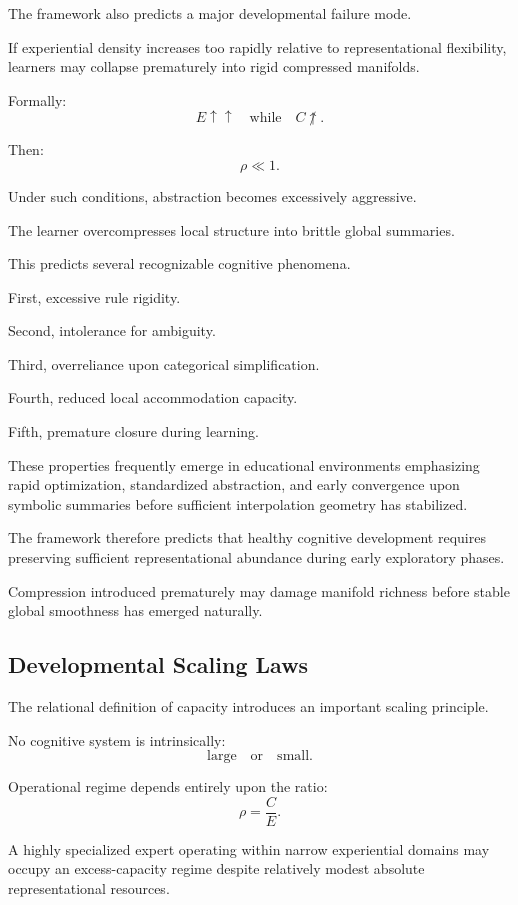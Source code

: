 \documentclass[12pt,a4paper]{article}
\begin{document}
The framework also predicts a major developmental failure mode.

If experiential density increases too rapidly relative to representational flexibility, learners may collapse prematurely into rigid compressed manifolds.

Formally:
\[
E
\uparrow\uparrow
\quad
\text{while}
\quad
C
\not\uparrow.
\]

Then:
\[
\rho
\ll
1.
\]

Under such conditions, abstraction becomes excessively aggressive.

The learner overcompresses local structure into brittle global summaries.

This predicts several recognizable cognitive phenomena.

First, excessive rule rigidity.

Second, intolerance for ambiguity.

Third, overreliance upon categorical simplification.

Fourth, reduced local accommodation capacity.

Fifth, premature closure during learning.

These properties frequently emerge in educational environments emphasizing rapid optimization, standardized abstraction, and early convergence upon symbolic summaries before sufficient interpolation geometry has stabilized.

The framework therefore predicts that healthy cognitive development requires preserving sufficient representational abundance during early exploratory phases.

Compression introduced prematurely may damage manifold richness before stable global smoothness has emerged naturally.

\subsection{Developmental Scaling Laws}

The relational definition of capacity introduces an important scaling principle.

No cognitive system is intrinsically:
\[
\text{large}
\quad
\text{or}
\quad
\text{small}.
\]

Operational regime depends entirely upon the ratio:
\[
\rho
=
\frac{C}{E}.
\]

A highly specialized expert operating within narrow experiential domains may occupy an excess-capacity regime despite relatively modest absolute representational resources.
\end{document}
